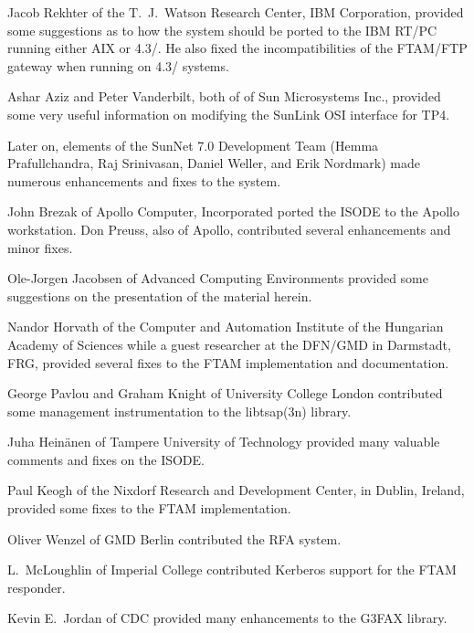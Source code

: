 Jacob Rekhter
of the T.~J.~Watson Research Center, IBM Corporation,
provided some suggestions as to how the system should be ported
to the IBM RT/PC running either AIX or 4.3\bsd/.
He also fixed the incompatibilities of the FTAM/FTP gateway when running on
4.3\bsd/ systems.

Ashar Aziz
and
Peter Vanderbilt,
both of of Sun Microsystems Inc.,
provided some very useful information on modifying the SunLink OSI interface
for TP4.

Later on,
elements of the SunNet 7.0 Development Team
(Hemma Prafullchandra, Raj Srinivasan, Daniel Weller, and Erik Nordmark)
made numerous enhancements and fixes to the system.

John Brezak
of Apollo Computer, Incorporated 
ported the ISODE to the Apollo workstation.
Don Preuss,
also of Apollo,
contributed several enhancements and minor fixes.

Ole-Jorgen Jacobsen of Advanced Computing
Environments provided some suggestions on the presentation of the material
herein.

Nandor Horvath
of the Computer and Automation Institute of the Hungarian Academy of Sciences
while a guest researcher at the DFN/GMD in Darmstadt, FRG,
provided several fixes to the FTAM implementation and documentation.

George Pavlou
and Graham Knight
of University College London contributed some management instrumentation to
the \man libtsap(3n) library.

Juha Hein\"{a}nen
of Tampere University of Technology
provided many valuable comments and fixes on the ISODE.

Paul Keogh
of the Nixdorf Research and Development Center, in Dublin, Ireland,
provided some fixes to the FTAM implementation.

Oliver Wenzel
of GMD Berlin contributed the RFA system.

L.~McLoughlin
of Imperial College contributed Kerberos support for the FTAM responder.

Kevin E.~Jordan
of CDC provided many enhancements to the G3FAX library.


